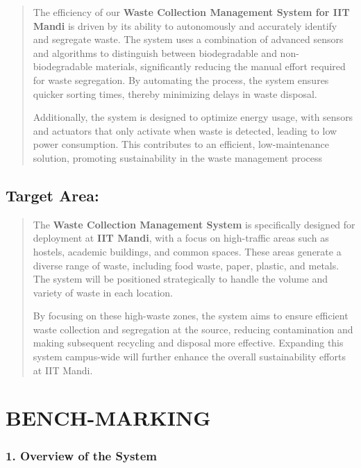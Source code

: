 \documentclass[
]{article}
\begin{document}
\begin{quote}
The efficiency of our \textbf{Waste Collection Management System for IIT
Mandi} is driven by its ability to autonomously and accurately identify
and segregate waste. The system uses a combination of advanced sensors
and algorithms to distinguish between biodegradable and
non-biodegradable materials, significantly reducing the manual effort
required for waste segregation. By automating the process, the system
ensures quicker sorting times, thereby minimizing delays in waste
disposal.

Additionally, the system is designed to optimize energy usage, with
sensors and actuators that only activate when waste is detected, leading
to low power consumption. This contributes to an efficient,
low-maintenance solution, promoting sustainability in the waste
management process
\end{quote}

\hypertarget{target-area}{%
\subsection{Target Area:}\label{target-area}}

\begin{quote}
The \textbf{Waste Collection Management System} is specifically designed
for deployment at \textbf{IIT Mandi}, with a focus on high-traffic areas
such as hostels, academic buildings, and common spaces. These areas
generate a diverse range of waste, including food waste, paper, plastic,
and metals. The system will be positioned strategically to handle the
volume and variety of waste in each location.

By focusing on these high-waste zones, the system aims to ensure
efficient waste collection and segregation at the source, reducing
contamination and making subsequent recycling and disposal more
effective. Expanding this system campus-wide will further enhance the
overall sustainability efforts at IIT Mandi.
\end{quote}

\hypertarget{bench-marking}{%
\section{BENCH-MARKING}\label{bench-marking}}

\hypertarget{overview-of-the-system}{%
\subsubsection{\texorpdfstring{\textbf{1. Overview of the
System}}{1. Overview of the System}}\label{overview-of-the-system}}
\end{document}
